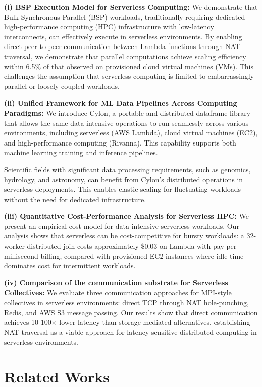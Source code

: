 \documentclass[conference]{IEEEtran}
\begin{document}
\textbf{(i) BSP Execution Model for Serverless Computing:} We demonstrate that Bulk Synchronous Parallel (BSP) workloads, traditionally requiring dedicated high-performance computing (HPC) infrastructure with low-latency interconnects, can effectively execute in serverless environments. By enabling direct peer-to-peer communication between Lambda functions through NAT traversal, we demonstrate that parallel computations achieve scaling efficiency within 6.5\% of that observed on provisioned cloud virtual machines (VMs). This challenges the assumption that serverless computing is limited to embarrassingly parallel or loosely coupled workloads.

\textbf{(ii) Unified Framework for ML Data Pipelines Across Computing Paradigms:} We introduce Cylon, a portable and distributed dataframe library that allows the same data-intensive operations to run seamlessly across various environments, including serverless (AWS Lambda), cloud virtual machines (EC2), and high-performance computing (Rivanna). This capability supports both machine learning training and inference pipelines. 

Scientific fields with significant data processing requirements, such as genomics, hydrology, and astronomy, can benefit from Cylon's distributed operations in serverless deployments. This enables elastic scaling for fluctuating workloads without the need for dedicated infrastructure.

\textbf{(iii) Quantitative Cost-Performance Analysis for Serverless HPC:} We present an empirical cost model for data-intensive serverless workloads. Our analysis shows that serverless can be cost-competitive for bursty workloads: a 32-worker distributed join costs approximately \$0.03 on Lambda with pay-per-millisecond billing, compared with provisioned EC2 instances where idle time dominates cost for intermittent workloads.

\textbf{(iv) Comparison of the communication substrate for Serverless Collectives:} We evaluate three communication approaches for MPI-style collectives in serverless environments: direct TCP through NAT hole-punching, Redis, and AWS S3 message passing. Our results show that direct communication achieves 10-100$\times$ lower latency than storage-mediated alternatives, establishing NAT traversal as a viable approach for latency-sensitive distributed computing in serverless environments.

\section{Related Works} \label{sec:relatedWorks}
\end{document}
